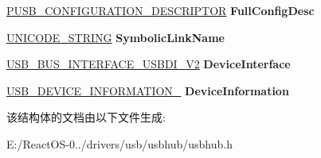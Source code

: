 \begin{DoxyCompactItemize}
\hyperlink{struct___u_s_b___c_o_n_f_i_g_u_r_a_t_i_o_n___d_e_s_c_r_i_p_t_o_r}{P\+U\+S\+B\+\_\+\+C\+O\+N\+F\+I\+G\+U\+R\+A\+T\+I\+O\+N\+\_\+\+D\+E\+S\+C\+R\+I\+P\+T\+OR} {\bfseries Full\+Config\+Desc}
\item 
\mbox{\label{struct___h_u_b___c_h_i_l_d_d_e_v_i_c_e___e_x_t_e_n_s_i_o_n_a6b66c00f70ee4a33c12180e182ed64b6}} 
\hyperlink{struct___u_n_i_c_o_d_e___s_t_r_i_n_g}{U\+N\+I\+C\+O\+D\+E\+\_\+\+S\+T\+R\+I\+NG} {\bfseries Symbolic\+Link\+Name}
\item 
\mbox{\label{struct___h_u_b___c_h_i_l_d_d_e_v_i_c_e___e_x_t_e_n_s_i_o_n_a584db22219677dd259fa8d25cfc93e3c}} 
\hyperlink{struct___u_s_b___b_u_s___i_n_t_e_r_f_a_c_e___u_s_b_d_i___v2}{U\+S\+B\+\_\+\+B\+U\+S\+\_\+\+I\+N\+T\+E\+R\+F\+A\+C\+E\+\_\+\+U\+S\+B\+D\+I\+\_\+\+V2} {\bfseries Device\+Interface}
\item 
\mbox{\label{struct___h_u_b___c_h_i_l_d_d_e_v_i_c_e___e_x_t_e_n_s_i_o_n_ad120bb18ee8adba04c48cf7ba9daf911}} 
\hyperlink{struct___u_s_b___d_e_v_i_c_e___i_n_f_o_r_m_a_t_i_o_n__0}{U\+S\+B\+\_\+\+D\+E\+V\+I\+C\+E\+\_\+\+I\+N\+F\+O\+R\+M\+A\+T\+I\+O\+N\+\_} {\bfseries Device\+Information}
\end{DoxyCompactItemize}


该结构体的文档由以下文件生成\+:\begin{DoxyCompactItemize}
\item 
E\+:/\+React\+O\+S-\/0../drivers/usb/usbhub/usbhub.\+h\end{DoxyCompactItemize}
